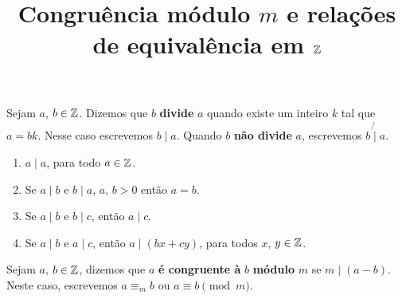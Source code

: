 \documentclass{beamer}
\title{Congruência módulo $m$ e rela\c{c}\~oes de equival\^encia em $\mathbb{Z}$}
\author[\autor]{\autor}
\institute[\instituto]{\instituto}
\date{}
\begin{document}
    \begin{frame}
        \maketitle
    \end{frame}


    \begin{frame}
        \begin{definicao}
            Sejam $a$, $b \in \mathbb{Z}$. \pause Dizemos que $b$ \textbf{divide} $a$ \pause quando existe um inteiro $k$ tal que $a=bk$. \pause Nesse caso escrevemos $b \mid a$. \pause Quando $b$ \textbf{n{\~a}o divide} $a$, \pause escrevemos $b\not{\mid}a$.
        \end{definicao}
    \end{frame}

    \begin{frame}
        \begin{proposicao}
            \begin{enumerate}[label={\roman*})]
                \item $a\mid a$, para todo $a \in \mathbb{Z}$.\pause \vspace{.3cm}
                \item Se $a\mid b$ e $b\mid a$, $a$, $b > 0$ ent\~ao $a = b$.\pause \vspace{.3cm}
                \item Se $a\mid b$ e $b\mid c$, ent{\~a}o $a\mid c$.\pause \vspace{.3cm}
                \item Se $a\mid b$ e $a\mid c$, ent{\~a}o $a\mid (bx+cy)$, para todos $x$, $y \in \mathbb{Z}$.
            \end{enumerate}
        \end{proposicao}
    \end{frame}

    \begin{frame}

        \begin{definicao}
            Sejam $a$, $b \in\mathbb{Z}$, \pause dizemos que $a$ \textbf{{\'e} congruente \`a} $b$ \pause \textbf{m{\'o}dulo} $m$ \pause se $m \mid (a-b)$. \pause Neste caso, escrevemos $a\equiv_{m} b$ \pause ou $a\equiv b \pmod{m}$.\pause
        \end{definicao}
    \end{frame}
\end{document}
